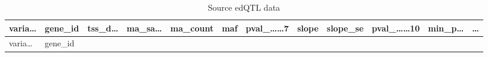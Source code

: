 \documentclass[
]{article}
\begin{document}
\begin{longtable}[]{@{}llllllllllll@{}}
\caption{\label{tab:source-edQTL-data}Source edQTL data}\tabularnewline
\toprule
\begin{minipage}[b]{0.06\columnwidth}\raggedright
varia\ldots{}\strut
\end{minipage} & \begin{minipage}[b]{0.06\columnwidth}\raggedright
gene\_id\strut
\end{minipage} & \begin{minipage}[b]{0.06\columnwidth}\raggedright
tss\_d\ldots{}\strut
\end{minipage} & \begin{minipage}[b]{0.06\columnwidth}\raggedright
ma\_sa\ldots{}\strut
\end{minipage} & \begin{minipage}[b]{0.06\columnwidth}\raggedright
ma\_count\strut
\end{minipage} & \begin{minipage}[b]{0.06\columnwidth}\raggedright
maf\strut
\end{minipage} & \begin{minipage}[b]{0.08\columnwidth}\raggedright
pval\_\ldots\ldots7\strut
\end{minipage} & \begin{minipage}[b]{0.06\columnwidth}\raggedright
slope\strut
\end{minipage} & \begin{minipage}[b]{0.06\columnwidth}\raggedright
slope\_se\strut
\end{minipage} & \begin{minipage}[b]{0.09\columnwidth}\raggedright
pval\_\ldots\ldots10\strut
\end{minipage} & \begin{minipage}[b]{0.06\columnwidth}\raggedright
min\_p\ldots{}\strut
\end{minipage} & \begin{minipage}[b]{0.02\columnwidth}\raggedright
\ldots{}\strut
\end{minipage}\tabularnewline
\midrule
\endfirsthead
\toprule
\begin{minipage}[b]{0.06\columnwidth}\raggedright
varia\ldots{}\strut
\end{minipage} & \begin{minipage}[b]{0.06\columnwidth}\raggedright
gene\_id\strut
\end{minipage} & \begin{minipage}[b]{0.06\columnwidth}\raggedright

\end{minipage}
\end{longtable}
\end{document}
